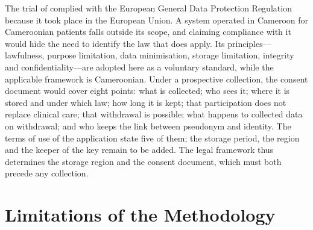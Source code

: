 The trial of \textcite{mihevc2025} complied with the European General Data Protection Regulation because it took place in the European Union. A system operated in Cameroon for Cameroonian patients falls outside its scope, and claiming compliance with it would hide the need to identify the law that does apply. Its principles---lawfulness, purpose limitation, data minimisation, storage limitation, integrity and confidentiality---are adopted here as a voluntary standard, while the applicable framework is Cameroonian. Under a prospective collection, the consent document would cover eight points: what is collected; who sees it; where it is stored and under which law; how long it is kept; that participation does not replace clinical care; that withdrawal is possible; what happens to collected data on withdrawal; and who keeps the link between pseudonym and identity. The terms of use of the application state five of them; the storage period, the region and the keeper of the key remain to be added. The legal framework thus determines the storage region and the consent document, which must both precede any collection.

\section{Limitations of the Methodology}\label{sec:meth-limits}

